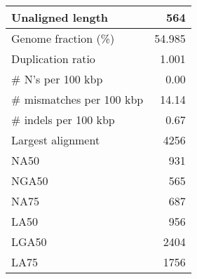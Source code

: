 \documentclass[12pt,a4paper]{article}
\begin{document}
\begin{table}[ht]
\begin{center}
\begin{tabular}{|l*{1}{|r}|}
Unaligned length & 564 \\ \hline
Genome fraction (\%) & 54.985 \\ \hline
Duplication ratio & 1.001 \\ \hline
\# N's per 100 kbp & 0.00 \\ \hline
\# mismatches per 100 kbp & 14.14 \\ \hline
\# indels per 100 kbp & 0.67 \\ \hline
Largest alignment & 4256 \\ \hline
NA50 & 931 \\ \hline
NGA50 & 565 \\ \hline
NA75 & 687 \\ \hline
LA50 & 956 \\ \hline
LGA50 & 2404 \\ \hline
LA75 & 1756 \\ \hline
\end{tabular}
\end{center}
\end{table}
\end{document}
